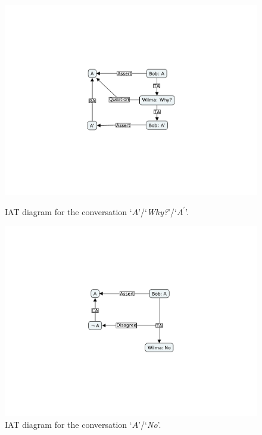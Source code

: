 \documentclass[smallextended,oneside]{svjour3}       %
\begin{document}
\begin{figure}[h]
\centering
\begin{minipage}{.4\linewidth}
\centering
\includegraphics[width=\linewidth,trim=9cm 7cm 8.5cm 6.9cm, clip]{TypicalIAT}
\caption{IAT diagram for the conversation `$A$'/`\emph{Why?}'/`$A^\prime$'.\label{fig:TypicalIAT}}
\end{minipage}
\hspace{.1\linewidth}
\begin{minipage}{.4\linewidth}
\centering
\includegraphics[width=\linewidth,trim=9cm 7cm 8.5cm 6.9cm, clip]{A-not-A}
\caption{IAT diagram for the conversation `$A$'/`\emph{No}'.\label{fig:A-not-A}}
\end{minipage}
\end{figure}
\end{document}

